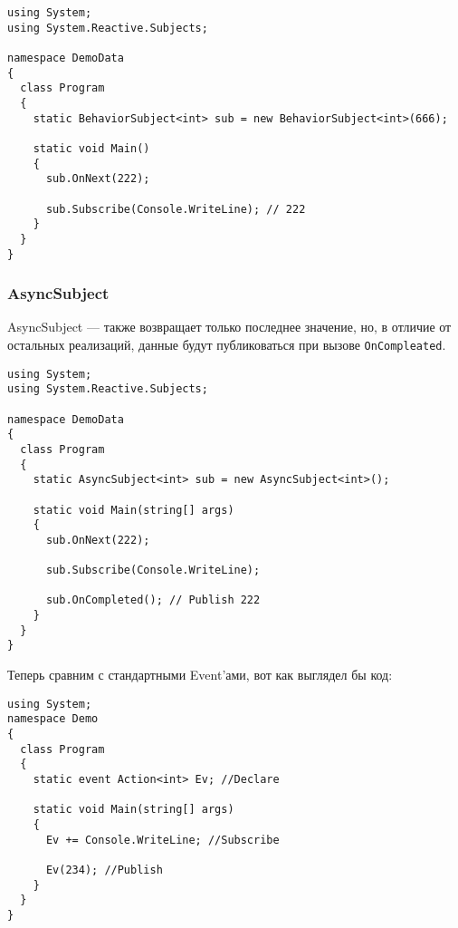 \begin{lstlisting}[style=csharpinlinestyle, caption={Пример использования BehaviorSubject}, label=lst:practice:reactive_extensions:behavior_subject_example]
using System;
using System.Reactive.Subjects;

namespace DemoData
{
  class Program
  {
    static BehaviorSubject<int> sub = new BehaviorSubject<int>(666);

    static void Main()
    {
      sub.OnNext(222);

      sub.Subscribe(Console.WriteLine); // 222
    }
  }
}
\end{lstlisting}

\subsubsection{AsyncSubject}
\label{subsub:practice:reactive_extensions:async_subject}

AsyncSubject --- также возвращает только последнее значение, но, в отличие от остальных реализаций, данные будут публиковаться при вызове \lstinline[style=csharpinlinestyle]!OnCompleated!.

\begin{lstlisting}[style=csharpinlinestyle, caption={Пример использования AsyncSubject}, label=lst:practice:reactive_extensions:async_subject_example]
using System;
using System.Reactive.Subjects;

namespace DemoData
{
  class Program
  {
    static AsyncSubject<int> sub = new AsyncSubject<int>();

    static void Main(string[] args)
    {
      sub.OnNext(222);

      sub.Subscribe(Console.WriteLine);

      sub.OnCompleted(); // Publish 222
    }
  }
}
\end{lstlisting}

Теперь сравним с стандартными Event’ами, вот как выглядел бы код:

\begin{lstlisting}[style=csharpinlinestyle, caption={Стандартная модель Event}, label=lst:practice:reactive_extensions:event_example]
using System;
namespace Demo
{
  class Program
  {
    static event Action<int> Ev; //Declare

    static void Main(string[] args)
    {
      Ev += Console.WriteLine; //Subscribe

      Ev(234); //Publish
    }
  }
}
\end{lstlisting}

